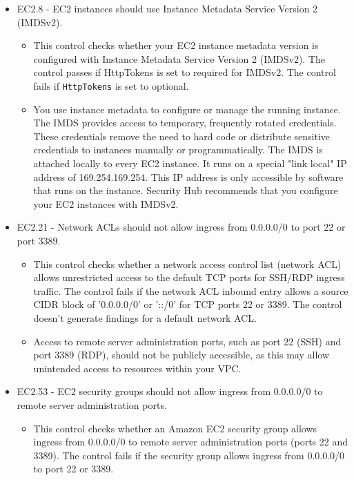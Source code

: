 \begin{mdframed}[backgroundcolor=gray!05, linecolor=gray!50]
\begin{itemize}
\begin{itemize}
    \end{itemize}
    \item EC2.8 - EC2 instances should use Instance Metadata Service Version 2 (IMDSv2).
    \begin{itemize}
        \item This control checks whether your EC2 instance metadata version is configured with Instance Metadata Service Version 2 (IMDSv2). The control passes if HttpTokens is set to required for IMDSv2. The control fails if \texttt{HttpTokens} is set to optional.
        \item You use instance metadata to configure or manage the running instance. The IMDS provides access to temporary, frequently rotated credentials. These credentials remove the need to hard code or distribute sensitive credentials to instances manually or programmatically. The IMDS is attached locally to every EC2 instance. It runs on a special "link local" IP address of 169.254.169.254. This IP address is only accessible by software that runs on the instance. Security Hub recommends that you configure your EC2 instances with IMDSv2.
    \end{itemize}
    \item EC2.21 - Network ACLs should not allow ingress from 0.0.0.0/0 to port 22 or port 3389.
    \begin{itemize}
        \item This control checks whether a network access control list (network ACL) allows unrestricted access to the default TCP ports for SSH/RDP ingress traffic. The control fails if the network ACL inbound entry allows a source CIDR block of '0.0.0.0/0' or '::/0' for TCP ports 22 or 3389. The control doesn't generate findings for a default network ACL.
        \item Access to remote server administration ports, such as port 22 (SSH) and port 3389 (RDP), should not be publicly accessible, as this may allow unintended access to resources within your VPC.
    \end{itemize}
    \item EC2.53 - EC2 security groups should not allow ingress from 0.0.0.0/0 to remote server administration ports.
    \begin{itemize}
        \item This control checks whether an Amazon EC2 security group allows ingress from 0.0.0.0/0 to remote server administration ports (ports 22 and 3389). The control fails if the security group allows ingress from 0.0.0.0/0 to port 22 or 3389.

\end{itemize}
\end{itemize}
\end{mdframed}
